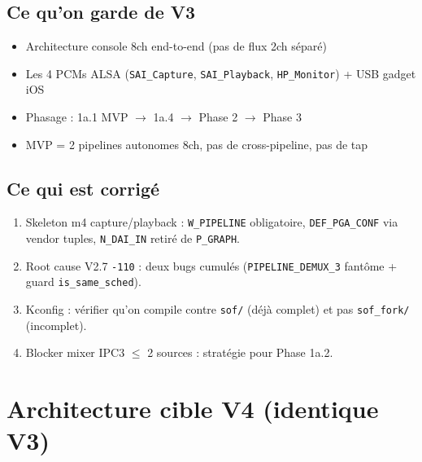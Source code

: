 \documentclass[11pt,a4paper]{article}
\begin{document}
\subsection{Ce qu'on garde de V3}

\begin{itemize}[leftmargin=*, itemsep=1pt]
  \item Architecture console 8ch end-to-end (pas de flux 2ch séparé)
  \item Les 4 PCMs ALSA (\texttt{SAI\_Capture}, \texttt{SAI\_Playback}, \texttt{HP\_Monitor}) + USB gadget iOS
  \item Phasage : 1a.1 MVP $\to$ 1a.4 $\to$ Phase 2 $\to$ Phase 3
  \item MVP = 2 pipelines autonomes 8ch, pas de cross-pipeline, pas de tap
\end{itemize}

\subsection{Ce qui est corrigé}

\begin{enumerate}[leftmargin=*, itemsep=2pt]
  \item Skeleton m4 capture/playback : \texttt{W\_PIPELINE} obligatoire, \texttt{DEF\_PGA\_CONF} via vendor tuples, \texttt{N\_DAI\_IN} retiré de \texttt{P\_GRAPH}.
  \item Root cause V2.7 \texttt{-110} : deux bugs cumulés (\texttt{PIPELINE\_DEMUX\_3} fantôme + guard \texttt{is\_same\_sched}).
  \item Kconfig : vérifier qu'on compile contre \texttt{sof/} (déjà complet) et pas \texttt{sof\_fork/} (incomplet).
  \item Blocker mixer IPC3 $\leq$ 2 sources : stratégie pour Phase 1a.2.
\end{enumerate}

\section{Architecture cible V4 (identique V3)}
\end{document}
